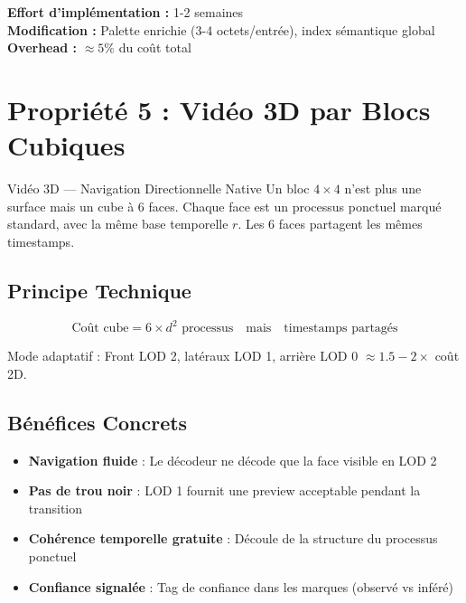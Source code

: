\documentclass[12pt,a4paper]{article}
\begin{document}
	\begin{techbox}
		\textbf{Effort d'implémentation :} 1-2 semaines \\
		\textbf{Modification :} Palette enrichie (3-4 octets/entrée), index sémantique global \\
		\textbf{Overhead :} $\approx 5\%$ du coût total
	\end{techbox}
	
	\section{Propriété 5 : Vidéo 3D par Blocs Cubiques}
	
	\begin{featurebox}{Vidéo 3D — Navigation Directionnelle Native}
		Un bloc $4 \times 4$ n'est plus une surface mais un cube à 6 faces. Chaque face est un processus ponctuel marqué standard, avec la même base temporelle $r$. Les 6 faces partagent les mêmes timestamps.
	\end{featurebox}
	
	\subsection{Principe Technique}
	
	\begin{equation}
		\text{Coût cube} = 6 \times d^2 \text{ processus} \quad \text{mais} \quad \text{timestamps partagés}
	\end{equation}
	
	Mode adaptatif : Front LOD 2, latéraux LOD 1, arrière LOD 0 $\approx 1.5-2 \times$ coût 2D.
	
	\subsection{Bénéfices Concrets}
	
	\begin{benefitbox}
		\begin{itemize}[leftmargin=*]
			\item \textbf{Navigation fluide} : Le décodeur ne décode que la face visible en LOD 2
			\item \textbf{Pas de trou noir} : LOD 1 fournit une preview acceptable pendant la transition
			\item \textbf{Cohérence temporelle gratuite} : Découle de la structure du processus ponctuel
			\item \textbf{Confiance signalée} : Tag de confiance dans les marques (observé vs inféré)
		\end{itemize}
	\end{benefitbox}
	
\end{document}
